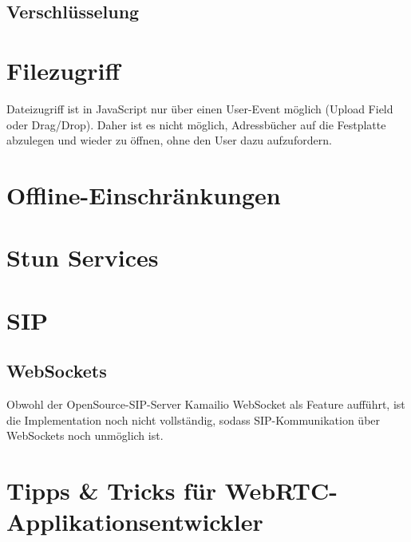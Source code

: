 		\subsection{Verschlüsselung}
	 	
	 
	 \section{Filezugriff}
	 	Dateizugriff ist in JavaScript nur über einen User-Event möglich (Upload
	 	Field oder Drag/Drop). Daher ist es nicht möglich, Adressbücher auf die
	 	Festplatte abzulegen und wieder zu öffnen, ohne den User dazu aufzufordern.
	 	
	 
	 \section{Offline-Einschränkungen}
	 	\section{Stun Services}
	 	
	 	
	 		
	 \section{SIP}
	 	\subsection{WebSockets}
	 		Obwohl der OpenSource-SIP-Server Kamailio WebSocket als Feature aufführt,
	 		ist die Implementation noch nicht vollständig, sodass SIP-Kommunikation über
	 		WebSockets noch unmöglich ist.


	\section{Tipps \& Tricks für WebRTC-Applikationsentwickler}
		